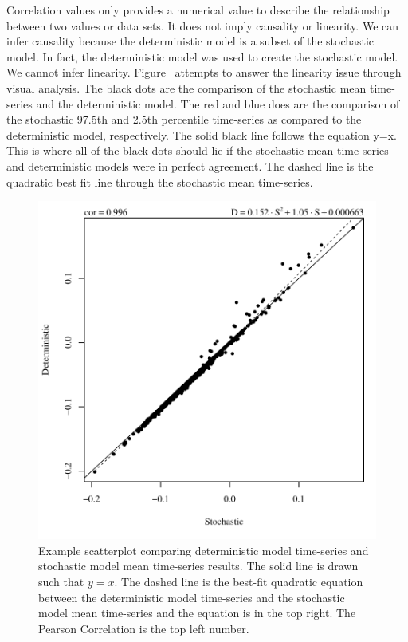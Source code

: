 \begin{linenumbers}
Correlation values only provides a numerical value to describe the relationship between two values or data sets.  It does not imply causality or linearity.  We can infer causality because the deterministic model is a subset of the stochastic model.  In fact, the deterministic model was used to create the stochastic model.  We cannot infer linearity.  Figure \ attempts to answer the linearity issue through visual analysis.  The black dots are the comparison of the stochastic mean time-series and the deterministic model.  The red and blue does are the comparison of the stochastic 97.5th and 2.5th percentile time-series as compared to the deterministic model, respectively.  The solid black line follows the equation y=x.  This is where all of the black dots should lie if the stochastic mean time-series and deterministic models were in perfect agreement.  The dashed line is the quadratic best fit line through the stochastic mean time-series.

\begin{figure}[htbp]
	\centering
	\includegraphics[width=0.9\linewidth]{"Figures/Results_USR/Stochastic/S-D Comparison-M Mass Flow"}
	\caption[Example scatterplot comparing the deterministic model time-series and stochastic model mean time-series results.]{Example scatterplot comparing deterministic model time-series and stochastic model mean time-series results.  The solid line is drawn such that $ y=x $.  The dashed line is the best-fit quadratic equation between the deterministic model time-series and the stochastic model mean time-series and the equation is in the top right. The Pearson Correlation is the top left number.}
	\label{fig:CorrelationExample}
\end{figure}


\end{linenumbers}
